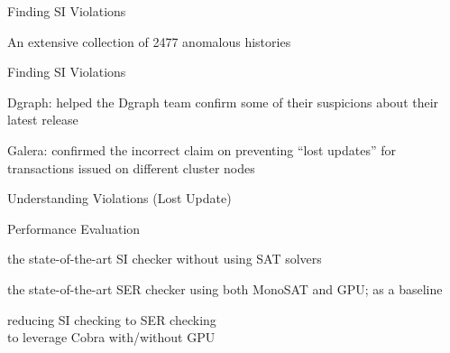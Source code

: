 \begin{frame}{Finding SI Violations}
	\begin{center}
		{}
		\vspace{0.60cm}

		An extensive collection of 2477 anomalous histories \\[2pt]
	\end{center}
\end{frame}

\begin{frame}{Finding SI Violations}
	\begin{center}
		Dgraph: helped the Dgraph team confirm some of their suspicions
		  about their latest release

		\vspace{0.50cm}
		{}
		\vspace{0.50cm}

		Galera: confirmed the incorrect claim on preventing ``lost updates''
		  for transactions issued on different cluster nodes
	\end{center}
\end{frame}

\begin{frame}{Understanding Violations (Lost Update)}
	\begin{center}
		
	\end{center}
\end{frame}

\begin{frame}{Performance Evaluation}
	\begin{description}
		\setlength{\itemsep}{15pt}
		\item[dbcop~\ncite{Complexity:OOPSLA2019}:]
			the state-of-the-art SI checker without using SAT solvers
		\item[Cobra~\ncite{Cobra:OSDI2020}:]
		  the state-of-the-art SER checker using both MonoSAT and GPU;
			as a baseline
		\item[CobraSI:] reducing SI checking to SER checking \\
		   to leverage Cobra with/without GPU
	\end{description}
\end{frame}

